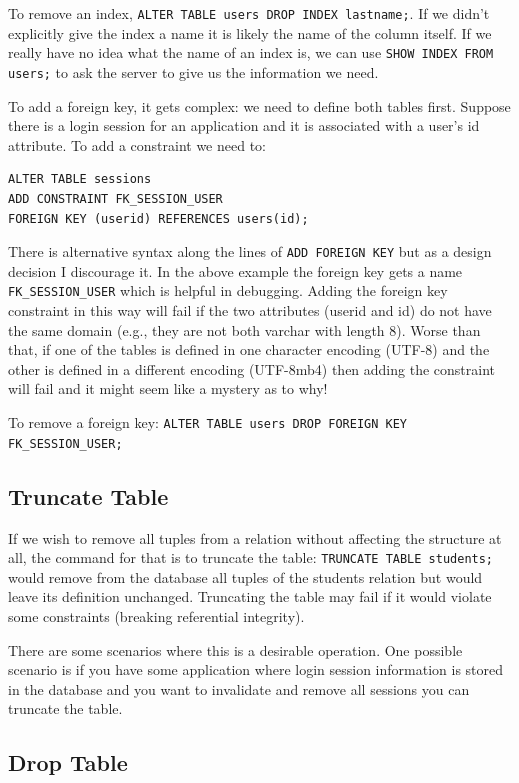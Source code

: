 To remove an index, \texttt{ALTER TABLE users DROP INDEX lastname;}. If we didn't explicitly give the index a name it is likely the name of the column itself. If we really have no idea what the name of an index is, we can use \texttt{SHOW INDEX FROM users;} to ask the server to give us the information we need.

To add a foreign key, it gets complex: we need to define both tables first. Suppose there is a login session for an application and it is associated with a user's id attribute. To add a constraint we need to:

\begin{verbatim}
ALTER TABLE sessions
ADD CONSTRAINT FK_SESSION_USER
FOREIGN KEY (userid) REFERENCES users(id);
\end{verbatim}

There is alternative syntax along the lines of \texttt{ADD FOREIGN KEY} but as a design decision I discourage it. In the above example the foreign key gets a name \texttt{FK\_SESSION\_USER} which is helpful in debugging. Adding the foreign key constraint in this way will fail if the two attributes (userid and id) do not have the same domain (e.g., they are not both varchar with length 8). Worse than that, if one of the tables is defined in one character encoding (UTF-8) and the other is defined in a different encoding (UTF-8mb4) then adding the constraint will fail and it might seem like a mystery as to why!

To remove a foreign key: \texttt{ALTER TABLE users DROP FOREIGN KEY FK\_SESSION\_USER;}


\subsection*{Truncate Table}

If we wish to remove all tuples from a relation without affecting the structure at all, the command for that is to truncate the table: \texttt{TRUNCATE TABLE students;} would remove from the database all tuples of the students relation but would leave its definition unchanged. Truncating the table may fail if it would violate some constraints (breaking referential integrity).

There are some scenarios where this is a desirable operation. One possible scenario is if you have some application where login session information is stored in the database and you want to invalidate and remove all sessions you can truncate the table.

\subsection*{Drop Table}

